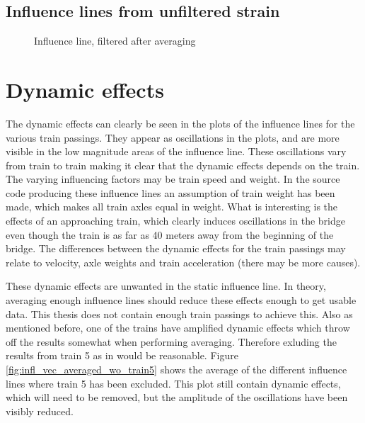 \subsection{Influence lines from unfiltered strain}
\begin{figure}[H]
	\begin{adjustbox}{center}
		
	\end{adjustbox}
	\caption{Influence line, filtered after averaging}
	\label{fig:infl_avg_filtered_after}
\end{figure}
\section{Dynamic effects}
The dynamic effects can clearly be seen in the plots of the influence lines for the various train passings. They appear as oscillations in the plots, and are more visible in the low magnitude areas of the influence line. These oscillations vary from train to train making it clear that the dynamic effects depends on the train. The varying influencing factors may be train speed and weight. In the source code producing these influence lines an assumption of train weight has been made, which makes all train axles equal in weight.
What is interesting is the effects of an approaching train, which clearly induces oscillations in the bridge even though the train is as far as 40 meters away from the beginning of the bridge. The differences between the dynamic effects for the train passings may relate to velocity, axle weights and train acceleration (there may be more causes).

These dynamic effects are unwanted in the static influence line. In theory, averaging enough influence lines should reduce these effects enough to get usable data. This thesis does not contain enough train passings to achieve this. Also as mentioned before, one of the trains have amplified dynamic effects which throw off the results somewhat when performing averaging. Therefore exluding the results from train 5 as in would be reasonable. Figure \ref{fig:infl_vec_averaged_wo_train5} shows the average of the different influence lines where train 5 has been excluded. This plot still contain dynamic effects, which will need to be removed, but the amplitude of the oscillations have been visibly reduced.

